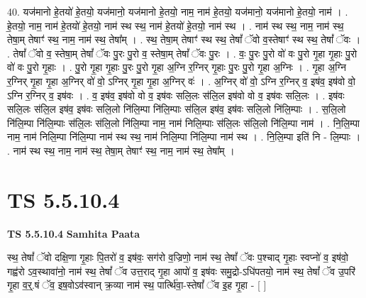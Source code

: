 \documentclass[17pt]{extarticle}
\begin{document}
40. यज॑मानो हे॒तयो॑ हे॒तयो॒ यज॑मानो॒ यज॑मानो हे॒तयो॒ नाम॒ नाम॑ हे॒तयो॒ यज॑मानो॒ यज॑मानो हे॒तयो॒ नाम॑ । . हे॒तयो॒ नाम॒ नाम॑ हे॒तयो॑ हे॒तयो॒ नाम॑ स्थ स्थ॒ नाम॑ हे॒तयो॑ हे॒तयो॒ नाम॑ स्थ । . नाम॑ स्थ स्थ॒ नाम॒ नाम॑ स्थ॒ तेषा॒म् तेषाꣳ॑ स्थ॒ नाम॒ नाम॑ स्थ॒ तेषा᳚म् । . स्थ॒ तेषा॒म् तेषाꣳ॑ स्थ स्थ॒ तेषां᳚ ॅवो व॒स्तेषाꣳ॑ स्थ स्थ॒ तेषां᳚ ॅवः । . तेषां᳚ ॅवो व॒ स्तेषा॒म् तेषां᳚ ॅवः पु॒रः पु॒रो व॒ स्तेषा॒म् तेषां᳚ ॅवः पु॒रः । . वः॒ पु॒रः पु॒रो वो॑ वः पु॒रो गृ॒हा गृ॒हाः पु॒रो वो॑ वः पु॒रो गृ॒हाः । . पु॒रो गृ॒हा गृ॒हाः पु॒रः पु॒रो गृ॒हा अ॒ग्नि र॒ग्निर् गृ॒हाः पु॒रः पु॒रो गृ॒हा अ॒ग्निः । . गृ॒हा अ॒ग्नि र॒ग्निर् गृ॒हा गृ॒हा अ॒ग्निर् वो॑ वो॒ ऽग्निर् गृ॒हा गृ॒हा अ॒ग्निर् वः॑ । . अ॒ग्निर् वो॑ वो॒ ऽग्नि र॒ग्निर् व॒ इष॑व॒ इष॑वो वो॒ ऽग्नि र॒ग्निर् व॒ इष॑वः । . व॒ इष॑व॒ इष॑वो वो व॒ इष॑वः सलि॒लः स॑लि॒ल इष॑वो वो व॒ इष॑वः सलि॒लः । . इष॑वः सलि॒लः स॑लि॒ल इष॑व॒ इष॑वः सलि॒लो नि॑लि॒म्पा नि॑लि॒म्पाः स॑लि॒ल इष॑व॒ इष॑वः सलि॒लो नि॑लि॒म्पाः । . स॒लि॒लो नि॑लि॒म्पा नि॑लि॒म्पाः स॑लि॒लः स॑लि॒लो नि॑लि॒म्पा नाम॒ नाम॑ निलि॒म्पाः स॑लि॒लः स॑लि॒लो नि॑लि॒म्पा नाम॑ । . नि॒लि॒म्पा नाम॒ नाम॑ निलि॒म्पा नि॑लि॒म्पा नाम॑ स्थ स्थ॒ नाम॑ निलि॒म्पा नि॑लि॒म्पा नाम॑ स्थ । . नि॒लि॒म्पा इति॑ नि - लि॒म्पाः । . नाम॑ स्थ स्थ॒ नाम॒ नाम॑ स्थ॒ तेषा॒म् तेषाꣳ॑ स्थ॒ नाम॒ नाम॑ स्थ॒ तेषा᳚म् । \newline
\pagebreak
{}

\section{ TS 5.5.10.4 }

\textbf{TS 5.5.10.4 } \newline
\textbf{Samhita Paata} \newline

स्थ॒ तेषां᳚ ॅवो दक्षि॒णा गृ॒हाः पि॒तरो॑ व॒ इष॑वः॒ सग॑रो व॒ज्रिणो॒ नाम॑ स्थ॒ तेषां᳚ ॅवः प॒श्चाद् गृ॒हाः स्वप्नो॑ व॒ इष॑वो॒ गह्व॑रो ऽव॒स्थावा॑नो॒ नाम॑ स्थ॒ तेषां᳚ ॅव उत्त॒राद् गृ॒हा आपो॑ व॒ इष॑वः समु॒द्रो-ऽधि॑पतयो॒ नाम॑ स्थ॒ तेषां᳚ ॅव उ॒परि॑ गृ॒हा व॒र्॒.षं ॅव॒ इष॒वोऽव॑स्वान् क्र॒व्या नाम॑ स्थ॒ पार्त्थि॑वा॒-स्तेषां᳚ ॅव इ॒ह गृ॒हा - [  ] \newline
\end{document}
